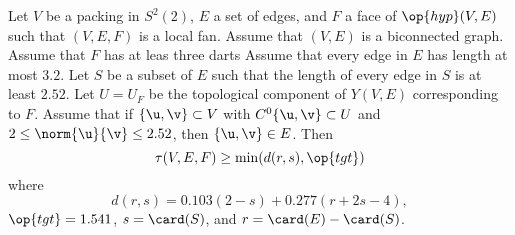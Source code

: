 \begin{theorem}\label{lemma:main-estimate-12} 
Let $V$ be a packing in $S^2(2)$, $E$ a set of edges, and $F$ a face of $\op{hyp}(V,E)$ such
that  $(V,E,F)$ is a local fan.
Assume that $(V,E)$ is a biconnected graph.  
Assume that  $F$ has at leas three darts
Assume that  every edge in $E$ has
length at most $3.2$.
 Let $S$ be a subset of $E$ such that the length of every edge in $S$
is at least $2.52$.
Let $U=U_F$ be the topological
component of $Y(V,E)$ corresponding to $F$.
   Assume that if $\{\u,\v\}\subset V$ with
$C^0\{\u,\v\}\subset U$ and $2\le\norm{\u}{\v} \le 2.52$, then $\{\u,\v\}\in E$.
Then
\begin{displaymath}\tau(V,E,F) \ge \min(d(r,s),\op{tgt})\end{displaymath}
where 
\begin{displaymath}
d(r,s) = 0.103 (2-s) + 0.277 (r+2s-4),
\end{displaymath}
$\op{tgt}=1.541$, 
$s = \card(S)$, and $r = \card(E)-\card(S)$.
\end{theorem}

